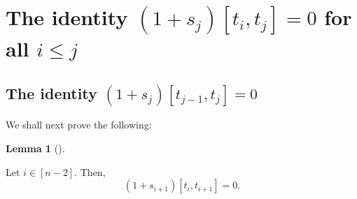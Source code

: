 \documentclass[numbers=enddot,12pt,final,onecolumn,notitlepage]{scrartcl}%
\theoremstyle{definition}
\newtheorem{lem}[theo]{Lemma}
\newenvironment{lemma}[1][]
{\begin{lem}[#1]\begin{leftbar}}
{\end{leftbar}\end{lem}}
\begin{document}
\section{The identity $\left(  1+s_{j}\right)  \left[  t_{i},t_{j}\right]  =0$
for all $i\leq j$}

\subsection{The identity $\left(  1+s_{j}\right)  \left[  t_{j-1}%
,t_{j}\right]  =0$}

We shall next prove the following:

\begin{lemma}
\label{lem.1+si+1titi+1}Let $i\in\left[  n-2\right]  $. Then,%
\[
\left(  1+s_{i+1}\right)  \left[  t_{i},t_{i+1}\right]  =0.
\]

\end{lemma}
\end{document}
